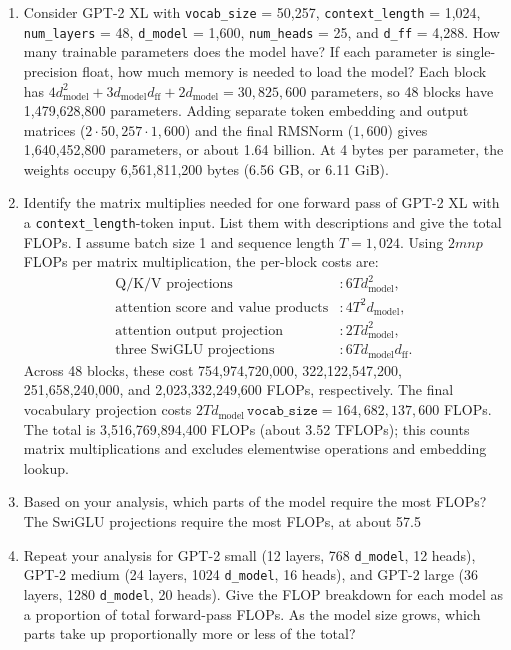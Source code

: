 \documentclass[11pt]{article}
\begin{document}
\begin{enumerate}[label=(\alph*)]
  \item Consider GPT-2 XL with \texttt{vocab\_size} = 50,257, \texttt{context\_length} = 1,024, \texttt{num\_layers} = 48, \texttt{d\_model} = 1,600, \texttt{num\_heads} = 25, and \texttt{d\_ff} = 4,288. How many trainable parameters does the model have? If each parameter is single-precision float, how much memory is needed to load the model?
  Each block has $4d_{\text{model}}^2 + 3d_{\text{model}}d_{\text{ff}} + 2d_{\text{model}} = 30{,}825{,}600$ parameters, so 48 blocks have 1,479,628,800 parameters. Adding separate token embedding and output matrices ($2 \cdot 50{,}257 \cdot 1{,}600$) and the final RMSNorm ($1{,}600$) gives 1,640,452,800 parameters, or about 1.64 billion. At 4 bytes per parameter, the weights occupy 6,561,811,200 bytes (6.56 GB, or 6.11 GiB).
  \item Identify the matrix multiplies needed for one forward pass of GPT-2 XL with a \texttt{context\_length}-token input. List them with descriptions and give the total FLOPs.
  I assume batch size 1 and sequence length $T=1{,}024$. Using $2mnp$ FLOPs per matrix multiplication, the per-block costs are:
  \begin{align*}
    \text{Q/K/V projections} &: 6Td_{\text{model}}^2, \\
    \text{attention score and value products} &: 4T^2d_{\text{model}}, \\
    \text{attention output projection} &: 2Td_{\text{model}}^2, \\
    \text{three SwiGLU projections} &: 6Td_{\text{model}}d_{\text{ff}}.
  \end{align*}
  Across 48 blocks, these cost 754,974,720,000, 322,122,547,200, 251,658,240,000, and 2,023,332,249,600 FLOPs, respectively. The final vocabulary projection costs $2Td_{\text{model}}\,\texttt{vocab\_size}=164{,}682{,}137{,}600$ FLOPs. The total is 3,516,769,894,400 FLOPs (about 3.52 TFLOPs); this counts matrix multiplications and excludes elementwise operations and embedding lookup.
  \item Based on your analysis, which parts of the model require the most FLOPs?
  The SwiGLU projections require the most FLOPs, at about 57.5%
  \item Repeat your analysis for GPT-2 small (12 layers, 768 \texttt{d\_model}, 12 heads), GPT-2 medium (24 layers, 1024 \texttt{d\_model}, 16 heads), and GPT-2 large (36 layers, 1280 \texttt{d\_model}, 20 heads). Give the FLOP breakdown for each model as a proportion of total forward-pass FLOPs. As the model size grows, which parts take up proportionally more or less of the total?

\end{enumerate}
\end{document}
